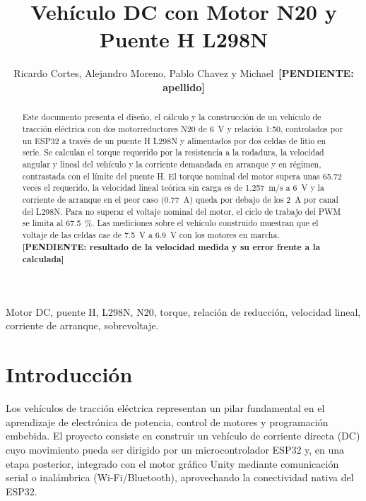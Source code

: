 \documentclass[conference]{IEEEtran}
\newcommand{\valSafetyRated}{65.72}
\newcommand{\valSpeedNoLoad}{1.257}
\newcommand{\valStallFullA}{0.77}
\newcommand{\valBatteryNoLoadMeasured}{7.5}
\newcommand{\valBatteryLoadMeasured}{6.9}
\newcommand{\pendiente}[1]{\textbf{[PENDIENTE: #1]}}
\begin{document}
\title{Vehículo DC con Motor N20 y Puente H L298N}
\author{Ricardo Cortes, Alejandro Moreno, Pablo Chavez y Michael~\pendiente{apellido}}
\maketitle

\begin{abstract}
Este documento presenta el diseño, el cálculo y la construcción de un vehículo de tracción eléctrica con dos motorreductores N20 de \SI{6}{V} y relación 1:50, controlados por un ESP32 a través de un puente H L298N y alimentados por dos celdas de litio en serie. Se calculan el torque requerido por la resistencia a la rodadura, la velocidad angular y lineal del vehículo y la corriente demandada en arranque y en régimen, contrastada con el límite del puente H. El torque nominal del motor supera unas \num[round-mode=places,round-precision=0]{\valSafetyRated} veces el requerido, la velocidad lineal teórica sin carga es de \SI{\valSpeedNoLoad}{m/s} a \SI{6}{V} y la corriente de arranque en el peor caso (\SI{\valStallFullA}{A}) queda por debajo de los \SI{2}{A} por canal del L298N. Para no superar el voltaje nominal del motor, el ciclo de trabajo del PWM se limita al \SI{67.5}{\percent}. Las mediciones sobre el vehículo construido muestran que el voltaje de las celdas cae de \SI{\valBatteryNoLoadMeasured}{V} a \SI{\valBatteryLoadMeasured}{V} con los motores en marcha. \pendiente{resultado de la velocidad medida y su error frente a la calculada}
\end{abstract}

\begin{IEEEkeywords}
Motor DC, puente H, L298N, N20, torque, relación de reducción, velocidad lineal, corriente de arranque, sobrevoltaje.
\end{IEEEkeywords}

\section{Introducción}
Los vehículos de tracción eléctrica representan un pilar fundamental en el aprendizaje de electrónica de potencia, control de motores y programación embebida. El proyecto consiste en construir un vehículo de corriente directa (DC) cuyo movimiento pueda ser dirigido por un microcontrolador ESP32 y, en una etapa posterior, integrado con el motor gráfico Unity mediante comunicación serial o inalámbrica (Wi-Fi/Bluetooth), aprovechando la conectividad nativa del ESP32.
\end{document}
